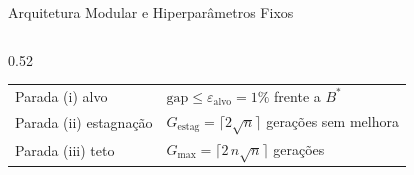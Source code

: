 \begin{frame}{Arquitetura Modular e Hiperparâmetros Fixos}
\begin{columns}[c,onlytextwidth]
\begin{column}{0.52\textwidth}
\begin{slidetabeladensa}[\slideTallFigH]
\begin{tabular}{@{}ll@{}}
          Parada (i) alvo                    & $\text{gap} \le \varepsilon_{\text{alvo}} = 1\%$ frente a $B^*$ \\
          Parada (ii) estagnação             & $G_{\text{estag}} = \lceil 2\sqrt{n} \rceil$ gerações sem melhora \\
          Parada (iii) teto                  & $G_{\max} = \lceil 2\,n\sqrt{n} \rceil$ gerações \\
          \bottomrule
        \end{tabular}
      \end{slidetabeladensa}
    \end{column}
  \end{columns}
\end{frame}

